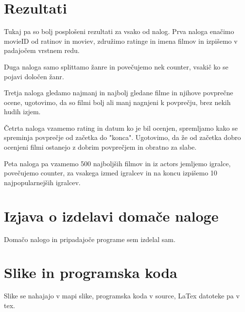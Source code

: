 \documentclass[a4paper,11pt]{article}
\begin{document}
\section{Rezultati}

Tukaj pa so bolj posplošeni rezultati za vsako od nalog.
  Prva naloga enačimo movieID od ratinov in moviev, združimo ratinge in imena filmov in izpišemo v padajočem vrstnem redu.
  
  Duga naloga samo splittamo žanre in povečujemo nek counter, vsakič ko se pojavi določen žanr.
  
  Tretja naloga gledamo najmanj in najbolj gledane filme in njihove povprečne ocene, ugotovimo, da so filmi bolj ali manj nagnjeni k povprečju, brez nekih hudih izjem.
  
  Četrta naloga vzamemo rating in datum ko je bil ocenjen, spremljamo kako se spreminja povprečje od začetka do "konca". Ugotovimo, da že od začetka dobro ocenjeni filmi ostanejo z dobrim povprečjem in obratno za slabe.
  
  Peta naloga pa vzamemo 500 najboljših filmov in iz actors jemljemo igralce, povečujemo counter, za vsakega izmed igralcev in na koncu izpišemo 10 najpopularnejših igralcev.
  

\section{Izjava o izdelavi domače naloge}
Domačo nalogo in pripadajoče programe sem izdelal sam.

\appendix
\appendixpage
\section{\label{app-res}Slike in programska koda}

Slike se nahajajo v mapi slike, programska koda v source, LaTex datoteke pa v tex.
\end{document}
